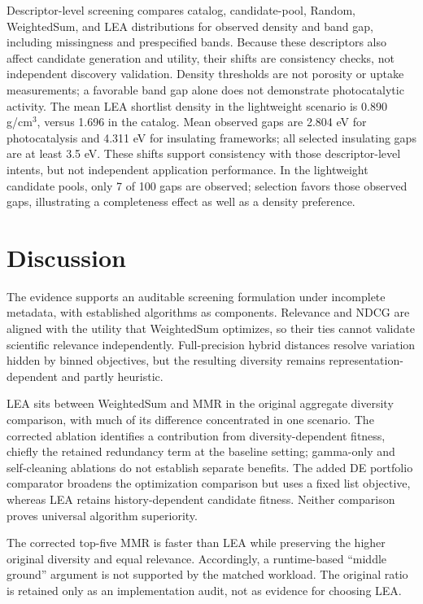 \documentclass[12pt,a4paper]{article}
\begin{document}
Descriptor-level screening compares catalog, candidate-pool, Random, WeightedSum, and LEA distributions for observed density and band gap, including missingness and prespecified bands. Because these descriptors also affect candidate generation and utility, their shifts are consistency checks, not independent discovery validation. Density thresholds are not porosity or uptake measurements; a favorable band gap alone does not demonstrate photocatalytic activity. The mean LEA shortlist density in the lightweight scenario is 0.890 g/cm$^3$, versus 1.696 in the catalog. Mean observed gaps are 2.804 eV for photocatalysis and 4.311 eV for insulating frameworks; all selected insulating gaps are at least 3.5 eV. These shifts support consistency with those descriptor-level intents, but not independent application performance. In the lightweight candidate pools, only 7 of 100 gaps are observed; selection favors those observed gaps, illustrating a completeness effect as well as a density preference.

\section{Discussion}
\label{sec:discussion}

The evidence supports an auditable screening formulation under incomplete metadata, with established algorithms as components. Relevance and NDCG are aligned with the utility that WeightedSum optimizes, so their ties cannot validate scientific relevance independently. Full-precision hybrid distances resolve variation hidden by binned objectives, but the resulting diversity remains representation-dependent and partly heuristic.

LEA sits between WeightedSum and MMR in the original aggregate diversity comparison, with much of its difference concentrated in one scenario. The corrected ablation identifies a contribution from diversity-dependent fitness, chiefly the retained redundancy term at the baseline setting; gamma-only and self-cleaning ablations do not establish separate benefits. The added DE portfolio comparator broadens the optimization comparison but uses a fixed list objective, whereas LEA retains history-dependent candidate fitness. Neither comparison proves universal algorithm superiority.

The corrected top-five MMR is faster than LEA while preserving the higher original diversity and equal relevance. Accordingly, a runtime-based ``middle ground'' argument is not supported by the matched workload. The original ratio is retained only as an implementation audit, not as evidence for choosing LEA.
\end{document}
